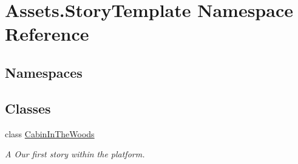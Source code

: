 \hypertarget{namespaceAssets_1_1StoryTemplate}{}\section{Assets.\+Story\+Template Namespace Reference}
\label{namespaceAssets_1_1StoryTemplate}
\subsection*{Namespaces}
\begin{DoxyCompactItemize}
\end{DoxyCompactItemize}
\subsection*{Classes}
\begin{DoxyCompactItemize}
\item 
class \hyperlink{classAssets_1_1StoryTemplate_1_1CabinInTheWoods}{Cabin\+In\+The\+Woods}
\begin{DoxyCompactList}\small\item\em A Our first story within the platform. \end{DoxyCompactList}\end{DoxyCompactItemize}
